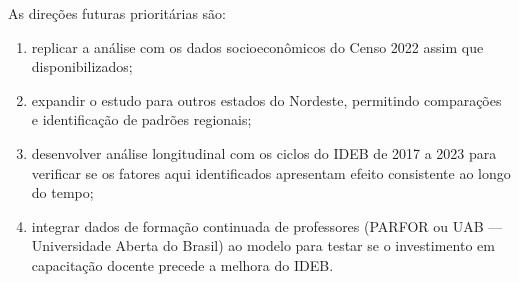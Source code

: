 As direções futuras prioritárias são:

\begin{enumerate}[label=\alph*)]
    \item replicar a análise com os dados socioeconômicos do Censo 2022 assim que disponibilizados;
    \item expandir o estudo para outros estados do Nordeste, permitindo comparações e identificação de padrões regionais;
    \item desenvolver análise longitudinal com os ciclos do IDEB de 2017 a 2023 para verificar se os fatores aqui identificados apresentam efeito consistente ao longo do tempo;
    \item integrar dados de formação continuada de professores (PARFOR ou UAB --- Universidade Aberta do Brasil) ao modelo para testar se o investimento em capacitação docente precede a melhora do IDEB.
\end{enumerate}